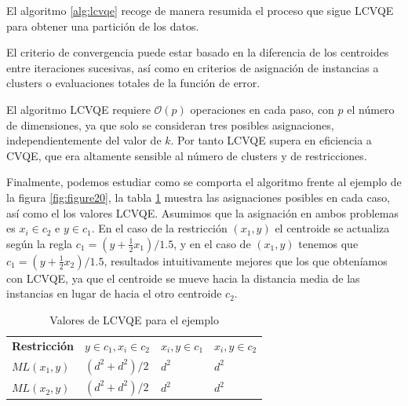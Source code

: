 El algoritmo \ref{alg:lcvqe} recoge de manera resumida el proceso que sigue \acs{LCVQE} para obtener una partición de los datos. 

El criterio de convergencia puede estar basado en la diferencia de los centroides entre iteraciones sucesivas, así como en criterios de asignación de instancias a clusters o evaluaciones totales de la función de error.

El algoritmo \acs{LCVQE} requiere $\mathcal{O}(p)$ operaciones en cada paso, con $p$ el número de dimensiones, ya que solo se consideran tres posibles asignaciones, independientemente del valor de $k$. Por tanto \acs{LCVQE} supera en eficiencia a \acs{CVQE}, que era altamente sensible al número de clusters y de restricciones.

Finalmente, podemos estudiar como se comporta el algoritmo frente al ejemplo de la figura \ref{fig:figure20}, la tabla \ref{tab:tabla4} muestra las asignaciones posibles en cada caso, así como el los valores \acs{LCVQE}. Asumimos que la asignación en ambos problemas es $x_i \in c_2$ e $y \in c_1$. En el caso de la restricción $(x_1, y)$ el centroide se actualiza según la regla $c_1 = (y + \frac{1}{2}x_1)/1.5$, y en el caso de $(x_1, y)$ tenemos que $c_1 = (y + \frac{1}{2}x_2)/1.5$, resultados intuitivamente mejores que los que obteníamos con \acs{LCVQE}, ya que el centroide se mueve hacia la distancia media de las instancias en lugar de hacia el otro centroide $c_2$.

\begin{table}[!h]
	\centering
	\setlength{\arrayrulewidth}{1mm}
	\setlength{\tabcolsep}{10pt}
	\renewcommand{\arraystretch}{1}
	
	\begin{tabular}{ >{\centering\arraybackslash}m{2cm}  >{\centering\arraybackslash}m{2.5cm}>{\centering\arraybackslash}m{2cm}>{\centering\arraybackslash}m{2cm}}
		\hline
		\rowcolor{black}
		\multicolumn{4}{c}{\bf \color{white}{Valores de LCVQE}}\\
		\hline
		\rowcolor{gray!50}
		\textbf{Restricción} & \textbf{$y \in c_1, x_i \in c_2$} & \textbf{$x_i,y \in c_1$} & \textbf{$x_i,y \in c_2$}  \\
		$ML(x_1, y)$ & $(d^2 + d^2)/2$ & $d^2$ & $d^2$  \\
		$ML(x_2, y)$  & $(d^2 + d^2)/2$ & $d^2$ & $d^2$ \\
		\hline
		
	\end{tabular}
	\caption[Valores de LCVQE para el ejemplo]{Valores de LCVQE para el ejemplo \cite{CECM:2012}}
	\label{tab:tabla4}
\end{table}

